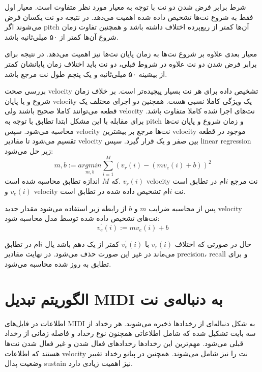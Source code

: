 شرط برابر فرض شدن دو نت با توجه به معیار مورد نظر متفاوت است. معیار اول فقط به
شروع نت‌ها تشخیص داده شده اهمیت می‌دهد. در نتیجه دو نت یکسان فرض می‌شوند اگر
\gls{pitch} آن‌ها کمتر از ربع‌پرده اختلاف داشته باشد و همچنین تفاوت زمان شروع
آن‌ها کمتر از ۵۰ میلی‌ثانیه باشد.

معیار بعدی علاوه بر شروع نت‌ها به زمان پایان نت‌ها نیز اهمیت می‌دهد. در نتیجه
برای برابر فرض شدن دو نت علاوه در شروط قبلی، دو نت باید اختلاف زمان پایانشان
کمتر از بیشینه ۵۰ میلی‌ثانیه و یک پنچم طول نت مرجع باشد.

بررسی صحت \gls{velocity} تشخیص داده برای هر نت بسیار پیچیده‌تر است. بر خلاف زمان
شروع و یا پایان \gls{velocity} یک ویژگی کاملا نسبی هست. همچنین دو اجرای مختلف یک
قطعه می‌توانند کاملا صحیح باشند ولی \gls{velocity} نت‌های اجرا شده کاملا متفاوت
باشد. برای مقابله با این مشکل ابتدا تطابق با توجه به \gls{pitch} و زمان شروع و
پایان نت‌ها محاسبه می‌شود. سپس \gls{velocity} نت‌ها مرجع بر بیشترین
\gls{velocity} موجود در قطعه تقسیم می‌شود تا مقادیر \gls{velocity} بین صفر و یک
قرار گیرد. سپس \gls{linear regression} زیر حل می‌شود:
\begin{equation}
    m, b := \underset{m, b}{argmin} \sum_{i=1}^{M} (v_r(i) - (mv_e(i) + b))^2
\end{equation}
که $M$ اندازه تطابق محاسبه شده است. $v_r(i)$ \gls{velocity} نت مرجع $i$ام در
تطابق است و $v_e(i)$ \gls{velocity} نت $i$ام تشخیص داده شده در تطابق است.

پس از محاسبه ضرایب $m$ و $b$ از رابطه زیر استفاده می‌شود مقدار جدید
\gls{velocity} نت‌های تشخیص داده شده توسط مدل محاسبه شود:
\begin{equation}
    v_e^\prime (i) := mv_e(i) + b
\end{equation}

حال در صورتی که اختلاف $v_r(i)$ با $v_e^\prime(i)$ کمتر از یک دهم باشد یال $i$ام
در تطابق می‌ماند در غیر این صورت حذف می‌شود. در نهایت مقادیر \gls{precision}،‌
\gls{recall} و  برای تطابق به روز شده محاسبه می‌شود.

\section{الگوریتم تبدیل MIDI به دنباله‌ی نت}
اطلاعات در فایل‌های \gls{MIDI} به شکل دنباله‌ای از رخدادها ذخیره می‌شوند. هر
رخداد از سه بایت تشکیل شده که شامل اطلاعاتی همچنون نوع رخداد و فاصله زمانی از
رخداد قبلی می‌شود. مهم‌ترین این رخدادها رخدادهای فعال شدن و غیر فعال شدن نت‌ها
هستند که اطلاعات \gls{velocity} نت را نیز شامل می‌شوند. همچنین در پیانو رخداد
تغییر وضعیت پدال \gls{sustain} نیز اهمیت زیادی دارد.

